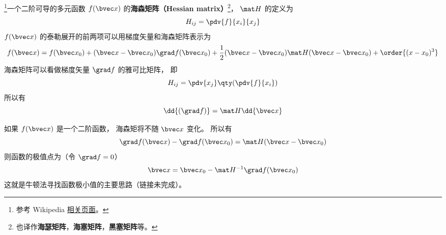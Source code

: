 
\begin{issues}
\issueDraft
\end{issues}


\footnote{参考 Wikipedia \href{https://en.wikipedia.org/wiki/Hessian_matrix}{相关页面}。}一个二阶可导的多元函数 $f(\bvec x)$ 的\textbf{海森矩阵（Hessian matrix）}\footnote{也译作\textbf{海瑟矩阵}，\textbf{海塞矩阵}，\textbf{黑塞矩阵}等。}， $\mat H$ 的定义为
\begin{equation}
H_{ij} = \pdv{f}{x_i}{x_j}
\end{equation}
$f(\bvec x)$ 的泰勒展开的前两项可以用梯度矢量和海森矩阵表示为
\begin{equation}
f(\bvec x) = f(\bvec x_0) + (\bvec x - \bvec x_0) \grad f(\bvec x_0) + \frac12(\bvec x - \bvec x_0) \mat H (\bvec x - \bvec x_0) + \order{(x-x_0)^3}
\end{equation}
海森矩阵可以看做梯度矢量 $\grad f$ 的雅可比矩阵， 即
\begin{equation}
H_{ij} = \pdv{x_j} \qty(\pdv{f}{x_i})
\end{equation}
所以有
\begin{equation}
\dd{(\grad f)} = \mat H \dd{\bvec x}
\end{equation}

如果 $f(\bvec x)$ 是一个二阶函数， 海森矩将不随 $\bvec x$ 变化。 所以有
\begin{equation}
\grad f(\bvec x) - \grad f(\bvec x_0) = \mat H (\bvec x - \bvec x_0)
\end{equation}
则函数的极值点为（令 $\grad f = 0$）
\begin{equation}
\bvec x = \bvec x_0 - \mat H^{-1} \grad f(\bvec x_0)
\end{equation}
这就是牛顿法寻找函数极小值的主要思路（链接未完成）。
